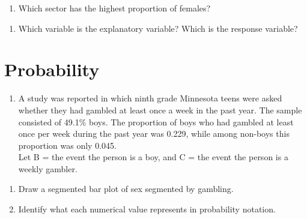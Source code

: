 \documentclass[
]{report}
\providecommand{\tightlist}{%
  \setlength{\itemsep}{0pt}\setlength{\parskip}{0pt}}
\begin{document}
\begin{enumerate}
\def\labelenumi{\arabic{enumi}.}
\setcounter{enumi}{6}
\tightlist
\item
  Which sector has the highest proportion of females?
\end{enumerate}

\vspace{0.5in}

\begin{enumerate}
\def\labelenumi{\arabic{enumi}.}
\setcounter{enumi}{7}
\tightlist
\item
  Which variable is the explanatory variable? Which is the response variable?
\end{enumerate}

\newpage

\hypertarget{probability}{%
\section{Probability}\label{probability}}

\begin{enumerate}
\def\labelenumi{\arabic{enumi}.}
\setcounter{enumi}{8}
\tightlist
\item
  A study was reported in which ninth grade Minnesota teens were asked whether they had gambled at least once a week in the past year. The sample consisted of 49.1\% boys. The proportion of boys who had gambled at least once per week during the past year was 0.229, while among non-boys this proportion was only 0.045.\\
  Let B = the event the person is a boy, and C = the event the person is a weekly gambler.
  \vspace{0.1in}
\end{enumerate}

\begin{enumerate}
\def\labelenumi{\alph{enumi}.}
\item
  Draw a segmented bar plot of sex segmented by gambling.
  \vspace{2in}
\item
  Identify what each numerical value represents in probability notation.
  \vspace{.1in}
\end{enumerate}
\end{document}
